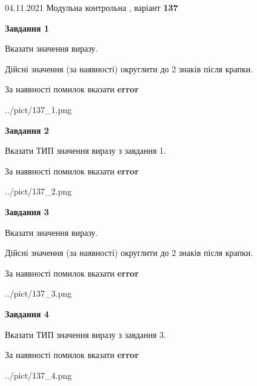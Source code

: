 \documentclass[11pt, ukrainian]{article}
\begin{document}
{04.11.2021 Модульна контрольна , варіант  \No \textbf { 137 }\par}
{
\begin {large}
{\begin {center}\textbf{Завдання 1}\end {center}}\par
Вказати значення виразу. \par
Дійсні значення (за наявності) округлити до 2 знаків після крапки. \par
За наявності помилок вказати \textbf{error}

\begin{center}
	{../pict/137_1.png}
\end{center}
\newpage

{\begin {center}\textbf{Завдання 2}\end {center}}\par
Вказати ТИП значення виразу з завдання 1. \par
За наявності помилок вказати \textbf{error}

\begin{center}
	{../pict/137_2.png}
\end{center}
\newpage

{\begin {center}\textbf{Завдання 3}\end {center}}\par
Вказати значення виразу. \par
Дійсні значення (за наявності) округлити до 2 знаків після крапки. \par
За наявності помилок вказати \textbf{error}

\begin{center}
	{../pict/137_3.png}
\end{center}
\newpage

{\begin {center}\textbf{Завдання 4}\end {center}}\par
Вказати ТИП значення виразу з завдання 3. \par
За наявності помилок вказати \textbf{error}

\begin{center}
	{../pict/137_4.png}
\end{center}
\newpage


\end{large}}
\end{document}
